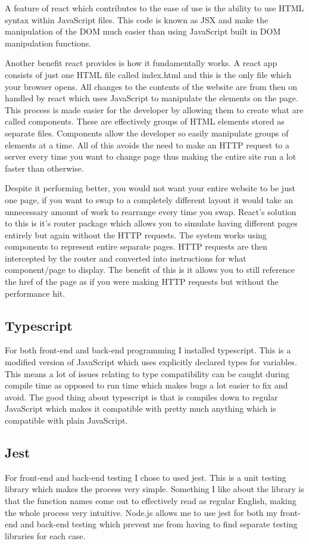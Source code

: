 \documentclass[]{final_report}
\begin{document}
A feature of react which contributes to the ease of use is the ability to use HTML syntax within JavaScript files. This code is known as JSX and make the manipulation of the DOM much easier than using JavaScript built in DOM manipulation functions.

Another benefit react provides is how it fundamentally works. A react app consists of just one HTML file called index.html and this is the only file which your browser opens. All changes to the contents of the website are from then on handled by react which uses JavaScript to manipulate the elements on the page. This process is made easier for the developer by allowing them to create what are called components. These are effectively groups of HTML elements stored as separate files. Components allow the developer so easily manipulate groups of elements at a time. All of this avoids the need to make an HTTP request to a server every time you want to change page thus making the entire site run a lot faster than otherwise.

\newpage
Despite it performing better, you would not want your entire website to be just one page, if you want to swap to a completely different layout it would take an unnecessary amount of work to rearrange every time you swap. React's solution to this is it's router package which allows you to simulate having different pages entirely but again without the HTTP requests. The system works using components to represent entire separate pages. HTTP requests are then intercepted by the router and converted into instructions for what component/page to display. The benefit of this is it allows you to still reference the href of the page as if you were making HTTP requests but without the performance hit.

\subsection{Typescript}
For both front-end and back-end programming I installed typescript. This is a modified version of JavaScript which uses explicitly declared types for variables. This means a lot of issues relating to type compatibility can be caught during compile time as opposed to run time which makes bugs a lot easier to fix and avoid. The good thing about typescript is that is compiles down to regular JavaScript which makes it compatible with pretty much anything which is compatible with plain JavaScript.

\subsection{Jest}
For front-end and back-end testing I chose to used jest. This is a unit testing library which makes the process very simple. Something I like about the library is that the function names come out to effectively read as regular English, making the whole process very intuitive. Node.js allows me to use jest for both my front-end and back-end testing which prevent me from having to find separate testing libraries for each case.
\end{document}
